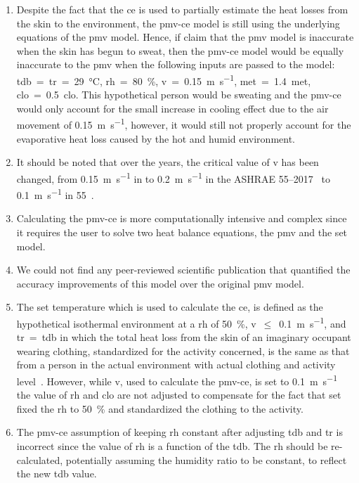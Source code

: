 \begin{enumerate}
    \item Despite the fact that the \ac{ce} is used to partially estimate the heat losses from the skin to the environment, the \ac{pmv-ce} model is still using the underlying equations of the \ac{pmv} model.
    Hence, if  claim that the \ac{pmv} model is inaccurate when the skin has begun to sweat, then the \ac{pmv-ce} model would be equally inaccurate to the \ac{pmv} when the following inputs are passed to the model: \ac{tdb}~=~\ac{tr}~=~\qty{29}{\celsius}, \ac{rh}~=~\qty{80}{\percent}, \ac{v}~=~\qty{0.15}{\m\per\s}, \ac{met}~=~\qty{1.4}{met}, \ac{clo}~=~\qty{0.5}{clo}.
    This hypothetical person would be sweating and the \ac{pmv-ce} would only account for the small increase in cooling effect due to the air movement of \qty{0.15}{\m\per\s}, however, it would still not properly account for the evaporative heat loss caused by the hot and humid environment.
    \item It should be noted that over the years, the critical value of \ac{v} has been changed, from \qty{0.15}{\m\per\s} in  to \qty{0.2}{\m\per\s} in the ASHRAE 55--2017~\cite{ASHRAE552017, arens_moving_2009} to \qty{0.1}{\m\per\s} in \gls{55}~\cite{ashrae552023}.
    \item Calculating the \ac{pmv-ce} is more computationally intensive and complex since it requires the user to solve two heat balance equations, the \ac{pmv} and the \ac{set} model.
    \item We could not find any peer-reviewed scientific publication that quantified the accuracy improvements of this model over the original \ac{pmv} model.
    \item The \ac{set} temperature which is used to calculate the \ac{ce}, is defined as the hypothetical isothermal environment at a \ac{rh} of \qty{50}{\percent}, \ac{v}~$\leq$~\qty{0.1}{\m\per\s}, and \ac{tr}~=~\ac{tdb} in which the total heat loss from the skin of an imaginary occupant wearing clothing, standardized for the activity concerned, is the same as that from a person in the actual environment with actual clothing and activity level~\cite{ashrae552023}.
    However, while \ac{v}, used to calculate the \ac{pmv-ce}, is set to \qty{0.1}{\m\per\s} the value of \ac{rh} and \ac{clo} are not adjusted to compensate for the fact that \ac{set} fixed the \ac{rh} to \qty{50}{\percent} and standardized the clothing to the activity.
    \item The \ac{pmv-ce} assumption of keeping \ac{rh} constant after adjusting \ac{tdb} and \ac{tr} is incorrect since the value of \ac{rh} is a function of the \ac{tdb}.
    The \ac{rh} should be re-calculated, potentially assuming the humidity ratio to be constant, to reflect the new \ac{tdb} value.
\end{enumerate}

